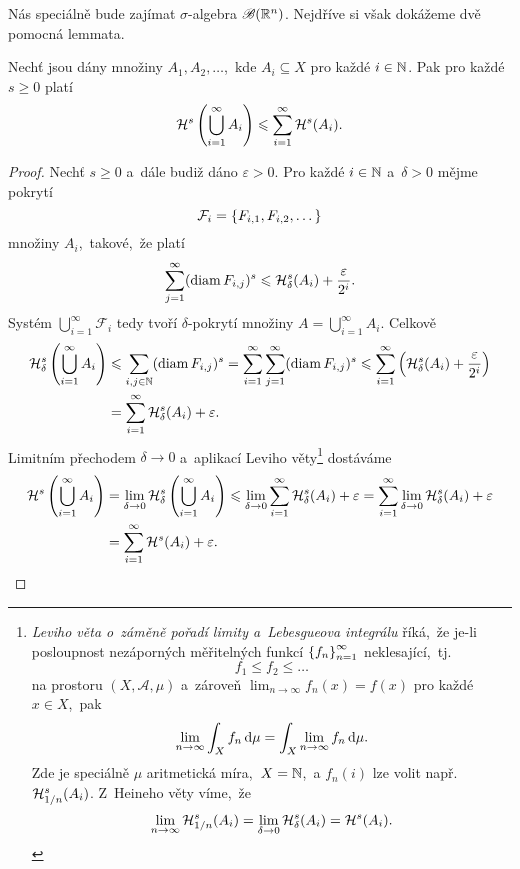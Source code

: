 Nás speciálně bude zajímat $\sigma$-algebra $\borelsigmaalgebra(\R^n)$. Nejdříve si však dokážeme dvě pomocná lemmata.
\begin{lemma}\label{lem:Hausdorffova-mira-subaditivita}
    Nechť jsou dány množiny $A_1,A_2,\ldots$,~kde $A_i\subseteq X$ pro každé $i\in\N$. Pak pro každé $s\geqslant 0$ platí
    \[\hausdorffmeasure{s}\left(\bigcup_{i=1}^\infty A_i\right)\leqslant\sum_{i=1}^{\infty}\hausdorffmeasure{s}(A_i).\]
\end{lemma}
\begin{proof}
    Nechť $s\geqslant 0$ a~dále budiž dáno $\varepsilon>0$. Pro každé $i\in\N$ a~$\delta>0$ mějme pokrytí
    \[\mathcal{F}_i=\set{F_{i,1},F_{i,2},\dots}\]
    množiny $A_i$,~takové,~že platí
    \[\sum_{j=1}^{\infty}(\diam{F_{i,j}})^s\leqslant\hausdorffdeltameasure{s}{\delta}(A_i)+\dfrac{\varepsilon}{2^i}.\]
    Systém $\bigcup_{i=1}^\infty\mathcal{F}_i$ tedy tvoří $\delta$-pokrytí množiny $A=\bigcup_{i=1}^\infty A_i$. Celkově
    \begin{align*}
        \hausdorffdeltameasure{s}{\delta}\left(\bigcup_{i=1}^\infty A_i\right)&\leqslant\sum_{i,j\in\N}(\diam{F_{i,j}})^s=\sum_{i=1}^{\infty}\sum_{j=1}^{\infty}(\diam{F_{i,j}})^s\leqslant\sum_{i=1}^{\infty}\left(\hausdorffdeltameasure{s}{\delta}(A_i)+\dfrac{\varepsilon}{2^i}\right)\\
        &=\sum_{i=1}^{\infty}\hausdorffdeltameasure{s}{\delta}(A_i)+\varepsilon.
    \end{align*}
    Limitním přechodem $\delta\to 0$ a~aplikací Leviho věty\footnote{\emph{Leviho věta o~záměně pořadí limity a~Lebesgueova integrálu} říká,~že je-li posloupnost nezáporných měřitelných funkcí $\set{f_n}_{n=1}^\infty$ neklesající,~tj.
    \[f_1\leqslant f_2\leqslant\dots\]
    na prostoru $(X,\mathcal{A},\mu)$ a~zároveň $\lim_{n\to\infty}f_n(x)=f(x)$ pro každé $x\in X$,~pak
    \[\lim_{n\to\infty}\int_X f_n\dx[\mu]=\int_X \lim_{n\to\infty}f_n\dx[\mu].\]
    Zde je speciálně $\mu$ aritmetická míra,~$X=\N$,~a $f_n(i)$ lze volit např. $\hausdorffdeltameasure{s}{1/n}(A_i)$. Z~Heineho věty víme,~že
    \[\lim_{n\to\infty}\hausdorffdeltameasure{s}{1/n}(A_i)=\lim_{\delta\to 0}\hausdorffdeltameasure{s}{\delta}(A_i)=\hausdorffmeasure{s}(A_i).\]
    }
    dostáváme
    \begin{align*}
        \hausdorffmeasure{s}\left(\bigcup_{i=1}^\infty A_i\right)&=\lim_{\delta\to 0}\hausdorffdeltameasure{s}{\delta}\left(\bigcup_{i=1}^\infty A_i\right)\leqslant\lim_{\delta\to 0}\sum_{i=1}^{\infty}\hausdorffdeltameasure{s}{\delta}(A_i)+\varepsilon=\sum_{i=1}^{\infty}\lim_{\delta\to 0}\hausdorffdeltameasure{s}{\delta}(A_i)+\varepsilon\\
        &=\sum_{i=1}^{\infty}\hausdorffmeasure{s}(A_i)+\varepsilon.
    \end{align*} 
\end{proof}
